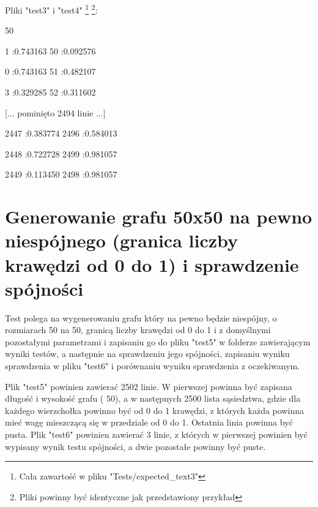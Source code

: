 \documentclass[11pt,a4paper]{report}
\def\console #1{\begingroup\fontfamily{qcr}\selectfont#1\endgroup}
\newenvironment{multiconsole}{\begingroup\fontfamily{qcr}\selectfont}{\endgroup}
\begin{document}
    \vspace{1em}

    Pliki "test3" i "test4" \footnote{Cała zawartość w pliku "Tests/expected\_text3"} \footnote{Pliki powinny być identyczne jak przedstawiony przykład}:

    \begin{multiconsole}
        50 50

        \hspace{2em}1 :0.743163  50 :0.092576 

        \hspace{2em}0 :0.743163  51 :0.482107 

        \hspace{2em}3 :0.329285  52 :0.311602 

        [... pominięto 2494 linie ...]

        \hspace{2em}2447 :0.383774  2496 :0.584013 

        \hspace{2em}2448 :0.722728  2499 :0.981057 

        \hspace{2em}2449 :0.113450  2498 :0.981057  
    \end{multiconsole}


    \newpage
    \section{Generowanie grafu 50x50 na pewno niespójnego (granica liczby krawędzi od 0 do 1) i sprawdzenie spójności}

    Test polega na wygenerowaniu grafu który na pewno będzie niespójny, o rozmiarach 50 na 50, granicą liczby krawędzi od 0 do 1 i z domyślnymi pozostałymi parametrami i zapisaniu go do pliku "test5" w folderze zawierającym wyniki testów, a następnie na sprawdzeniu jego spójności, zapisaniu wyniku sprawdzenia w pliku "test6" i porównaniu wyniku sprawdzenia z oczekiwanym.
    
    Plik "test5" powinien zawierać 2502 linie. W pierwszej powinna być zapisana długość i wysokość grafu (\console{50 50}), a w następnych 2500 lista sąsiedztwa, gdzie dla każdego wierzchołka powinno być od 0 do 1 krawędzi, z których każda powinna mieć wagę mieszczącą się w przedziale od 0 do 1. Ostatnia linia powinna być pusta. Plik "test6" powinien zawierać 3 linie, z których w pierwszej powinien być wypisany wynik testu spójności, a dwie pozostałe powinny być puste.
    
\end{document}
